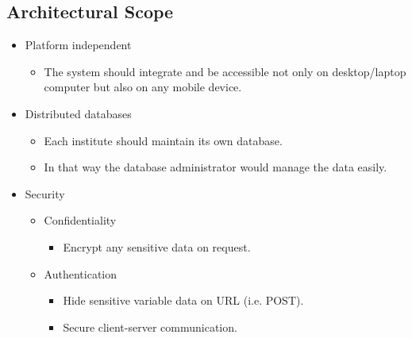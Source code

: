 \subsection{Architectural Scope}


\begin{itemize}	
		\item Platform independent
			\begin{itemize}
				\item The system should integrate and be accessible not only on 						desktop/laptop computer but also on any mobile device.
			\end{itemize}
\end{itemize}

\begin{itemize}	
		\item Distributed databases
			\begin{itemize}
				\item Each institute should maintain its own database. 
				\item In that way the database administrator would manage the data 						easily.
			\end{itemize}
\end{itemize}

\begin{itemize}	
		\item Security
			\begin{itemize}
				\item Confidentiality 
					\begin{itemize}
						\item Encrypt any sensitive data on request.  
					\end{itemize}
			\end{itemize}
			\begin{itemize}
				\item Authentication 
					\begin{itemize}
						\item Hide sensitive variable data on URL (i.e. POST).
						\item Secure client-server communication.   
					\end{itemize}
			\end{itemize}
\end{itemize}
